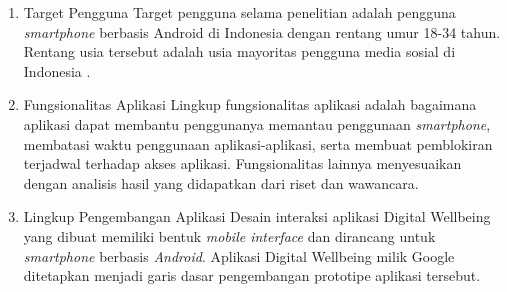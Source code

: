 \begin{enumerate}
  \item Target Pengguna
  \subitem Target pengguna selama penelitian adalah pengguna \textit{smartphone} berbasis Android di Indonesia dengan rentang umur 18-34 tahun. Rentang usia tersebut adalah usia mayoritas pengguna media sosial di Indonesia \parencite{mediasosial2020}.
  
  \item Fungsionalitas Aplikasi
  \subitem Lingkup fungsionalitas aplikasi adalah bagaimana aplikasi dapat membantu penggunanya memantau penggunaan \textit{smartphone}, membatasi waktu penggunaan aplikasi-aplikasi, serta membuat pemblokiran terjadwal terhadap akses aplikasi. Fungsionalitas lainnya menyesuaikan dengan analisis hasil yang didapatkan dari riset dan wawancara. 
   
  \item Lingkup Pengembangan Aplikasi
  \subitem Desain interaksi aplikasi Digital Wellbeing yang dibuat memiliki bentuk \textit{mobile interface} dan dirancang untuk \textit{smartphone} berbasis \textit{Android}. Aplikasi Digital Wellbeing milik Google ditetapkan menjadi garis dasar pengembangan prototipe aplikasi tersebut.

\end{enumerate}





\newpage

